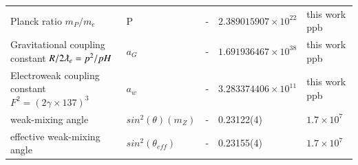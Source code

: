 \documentclass[a4paper,9pt]{article}
\begin{document}
\begin{table}
\begin{tabular}{lllll}
 Planck ratio $m_P/m_e$ & P  & -  & $2.389015907 \times 10^{22}$ & this work ppb  \\
 Gravitational coupling constant $R/2\lambdabar_e = p^2/pH$ & $a_G$   & -  & $1.691936467 \times 10^{38}$ & this work ppb  \\
 Electroweak coupling constant $F^2 = (2\gamma\times 137)^3$ & $a_w$   & -  & $3.283374406 \times 10^{11}$ & this work ppb  \\
 weak-mixing angle & $sin^2(\theta)(m_Z)$   & -  & 0.23122(4) & $1.7 \times 10^7$  \\
 effective weak-mixing angle & $sin^2(\theta_{eff})$   & -  & 0.23155(4) & $1.7 \times 10^7$  \\
  
    
    \bottomrule
  \end{tabular}
\end{table}
\end{document}
